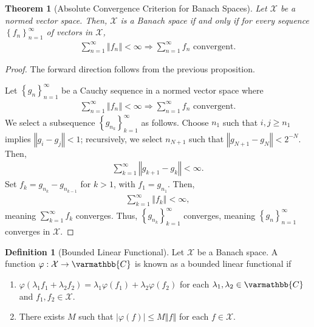 \documentclass[10pt]{extarticle}
\newcommand{\C}{\mathbb{C}}
\newcommand{\norm}[1]{\left\Vert #1\right\Vert}
\newcommand{\set}[1]{\left\{#1\right\}}
\theoremstyle{plain}
\newtheorem*{theorem}{Theorem}
\theoremstyle{definition}
\newtheorem*{definition}{Definition}
\theoremstyle{note}
\renewcommand*{\mathbb}[1]{\varmathbb{#1}}
\renewcommand{\newline}{\hfill\break}
\begin{document}
\begin{theorem}[Absolute Convergence Criterion for Banach Spaces]
  Let $\mathcal{X}$ be a normed vector space. Then, $\mathcal{X}$ is a Banach space if and only if for every sequence $\set{f_{n}}_{n=1}^{\infty}$ of vectors in $\mathcal{X}$,
  \begin{align*}
    \sum_{n=1}^{\infty}\norm{f_n} < \infty \Rightarrow \sum_{n=1}^{\infty}f_n\text{ convergent.}
  \end{align*}
\end{theorem}
\begin{proof}
  The forward direction follows from the previous proposition.\newline

  Let $\set{g_n}_{n=1}^{\infty}$ be a Cauchy sequence in a normed vector space where
  \begin{align*}
    \sum_{n=1}^{\infty}\norm{f_n} < \infty \Rightarrow \sum_{n=1}^{\infty}f_n\text{ convergent.}
  \end{align*}
  We select a subsequence $\set{g_{n_k}}_{k=1}^{\infty}$ as follows. Choose $n_1$ such that $i,j\geq n_1$ implies $\norm{g_i - g_j} < 1$; recursively, we select $n_{N+1}$ such that $\norm{g_{N+1} - g_N} < 2^{-N}$. Then,
  \begin{align*}
    \sum_{k=1}^{\infty}\norm{g_{k+1} - g_k} < \infty.
  \end{align*}
  Set $f_k = g_{n_k} - g_{n_{k-1}}$ for $k > 1$, with $f_1 = g_{n_1}$. Then,
  \begin{align*}
    \sum_{k=1}^{\infty}\norm{f_{k}} < \infty,
  \end{align*}
  meaning $\displaystyle\sum_{k=1}^{\infty}f_k$ converges. Thus, $\set{g_{n_k}}_{k=1}^{\infty}$ converges, meaning $\set{g_{n}}_{n=1}^{\infty}$ converges in $\mathcal{X}$.
\end{proof}
\begin{definition}[Bounded Linear Functional]
Let $\mathcal{X}$ be a Banach space. A function $\varphi: \mathcal{X}\rightarrow \C$ is known as a bounded linear functional if
\begin{enumerate}[(1)]
  \item $\displaystyle \varphi(\lambda_1f_1 + \lambda_2f_2) = \lambda_1\varphi(f_1) + \lambda_2\varphi(f_2)$ for each $\lambda_1,\lambda_2\in \C$ and $f_1,f_2\in \mathcal{X}$.
  \item There exists $M$ such that $|\varphi(f)| \leq M\norm{f}$ for each $f\in \mathcal{X}$.
\end{enumerate}
\end{definition}
\end{document}
